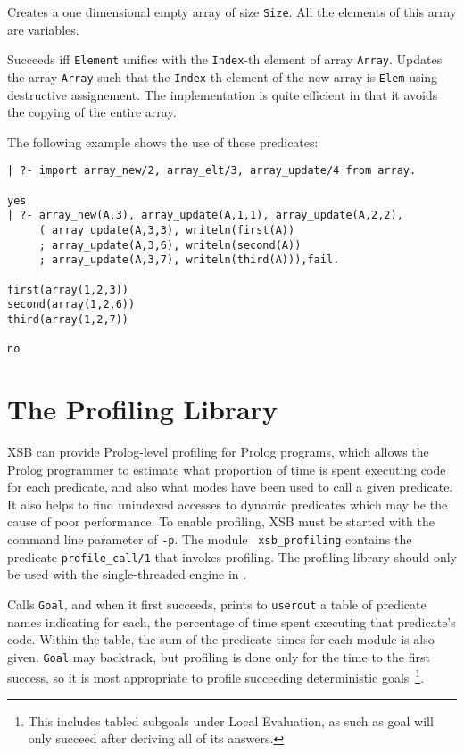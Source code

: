 \begin{description}
%
Creates a one dimensional empty array of size {\tt Size}.  All the
elements of this array are variables.  

%
Succeeds iff {\tt Element} unifies with the {\tt Index}-th element of
array {\tt Array}.  
%
%
Updates the array {\tt Array} such that the {\tt Index}-th element of
the new array is {\tt Elem} using destructive assignement.  The
implementation is quite efficient in that it avoids the copying of the
entire array.
\end{description}

The following example shows the use of these predicates:
{\footnotesize
\begin{verbatim}
| ?- import array_new/2, array_elt/3, array_update/4 from array.

yes
| ?- array_new(A,3), array_update(A,1,1), array_update(A,2,2),
     ( array_update(A,3,3), writeln(first(A))
     ; array_update(A,3,6), writeln(second(A))
     ; array_update(A,3,7), writeln(third(A))),fail.

first(array(1,2,3))
second(array(1,2,6))
third(array(1,2,7))

no
\end{verbatim}
}

\section{The Profiling Library} \label{sec:profile}

XSB can provide Prolog-level profiling for Prolog programs, which
allows the Prolog programmer to estimate what proportion of time is
spent executing code for each predicate, and also what modes have been
used to call a given predicate.  It also helps to find unindexed
accesses to dynamic predicates which may be the cause of poor
performance.  To enable profiling, XSB must be
started with the command line parameter of {\tt -p}.  The module {\tt
  xsb\_profiling} contains the predicate {\tt profile\_call/1} that
invokes profiling.  The profiling library should only be used with the
single-threaded engine in \version{}.

\begin{description}

Calls {\tt Goal}, and when it first succeeds, prints to {\tt userout}
a table of predicate names indicating for each, the percentage of time
spent executing that predicate's code.  Within the table, the sum of
the predicate times for each module is also given.  {\tt Goal} may
backtrack, but profiling is done only for the time to the first
success, so it is most appropriate to profile succeeding deterministic
goals~\footnote{This includes tabled subgoals under Local Evaluation,
  as such as goal will only succeed after deriving all of its
  answers.}.
\end{description}

